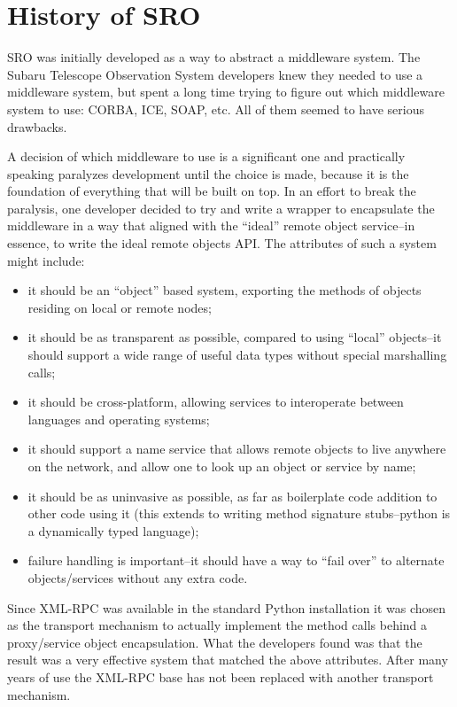 \documentclass[11pt]{report}
\begin{document}
\section{History of SRO}
SRO was initially developed as a way to abstract a middleware system.
The Subaru Telescope Observation System developers knew they needed to
use a middleware system, but spent a long time trying to figure out
which middleware system to use: CORBA, ICE, SOAP, etc.  All of
them seemed to have serious drawbacks.

A decision of which middleware to use is a significant one and
practically speaking paralyzes development until the choice is made,
because it is the foundation of everything that will be built on top.
In an effort to break the paralysis, one developer decided to try and
write a wrapper to encapsulate the middleware in a way that aligned with
the ``ideal'' remote object service--in essence, to write the ideal
remote objects API.  The attributes of such a system might include: 
\begin{itemize}
\item it should be an ``object'' based system, exporting the methods of
  objects residing on local or remote nodes;
\item it should be as transparent as possible, compared to using
  ``local'' objects--it should support a wide range of useful data types
  without special marshalling calls;
\item it should be cross-platform, allowing services to interoperate
  between languages and operating systems;
\item it should support a name service that allows remote objects to
  live anywhere on the network, and allow one to look up an object or
  service by name;
\item it should be as uninvasive as possible, as far as boilerplate code
  addition to other code using it (this extends to writing method
  signature stubs--python is a dynamically typed language);
\item failure handling is important--it should have a way to ``fail
  over'' to alternate objects/services without any extra code.
\end{itemize}

Since XML-RPC was available in the standard Python installation it
was chosen as the transport mechanism to actually implement the method
calls behind a proxy/service object encapsulation.  What the developers
found was that the result was a very effective system that matched the
above attributes.  After many years of use the XML-RPC base has not been
replaced with another transport mechanism.
\end{document}
